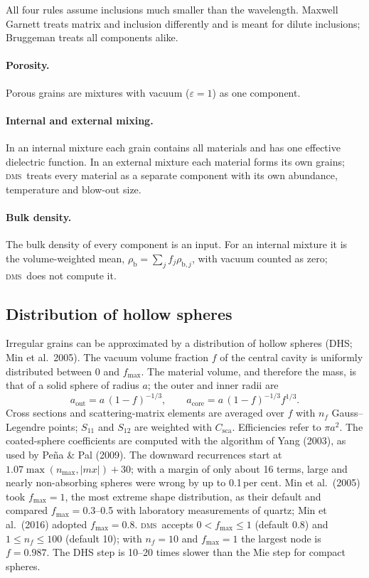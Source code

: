 \documentclass[11pt,a4paper]{article}
\newcommand{\dms}{\textsc{dms}}
\begin{document}
All four rules assume inclusions much smaller than the wavelength. Maxwell Garnett treats matrix
and inclusion differently and is meant for dilute inclusions; Bruggeman treats all components
alike.

\paragraph{Porosity.} Porous grains are mixtures with vacuum ($\varepsilon=1$) as one component.
\paragraph{Internal and external mixing.} In an internal mixture each grain contains all materials
and has one effective dielectric function. In an external mixture each material forms its own
grains; \dms\ treats every material as a separate component with its own abundance, temperature
and blow-out size.
\paragraph{Bulk density.} The bulk density of every component is an input. For an internal
mixture it is the volume-weighted mean, $\rho_\mathrm{b}=\sum_j f_j\rho_{\mathrm{b},j}$, with
vacuum counted as zero; \dms\ does not compute it.

\subsection{Distribution of hollow spheres}
\label{sec:dhs}

Irregular grains can be approximated by a distribution of hollow spheres (DHS; Min et al.\ 2005).
The vacuum volume fraction $f$ of the central cavity is uniformly distributed between 0 and
$f_\mathrm{max}$. The material volume, and therefore the mass, is that of a solid sphere of radius
$a$; the outer and inner radii are
\begin{equation}
a_\mathrm{out} = a\,(1-f)^{-1/3},\qquad a_\mathrm{core} = a\,(1-f)^{-1/3}f^{1/3}.
\end{equation}
Cross sections and scattering-matrix elements are averaged over $f$ with $n_f$ Gauss--Legendre
points; $S_{11}$ and $S_{12}$ are weighted with $C_\mathrm{sca}$. Efficiencies refer to $\pi a^2$.
The coated-sphere coefficients are computed with the algorithm of Yang (2003), as used by Pe\~na \&
Pal (2009). The downward recurrences start at $1.07\max(n_\mathrm{max},|mx|)+30$; with a margin of
only about 16 terms, large and nearly non-absorbing spheres were wrong by up to 0.1\,per cent.
Min et al.\ (2005) took $f_\mathrm{max}=1$,
the most extreme shape distribution, as their default and compared $f_\mathrm{max}=0.3$--0.5 with
laboratory measurements of quartz; Min et al.\ (2016) adopted $f_\mathrm{max}=0.8$. \dms\ accepts
$0<f_\mathrm{max}\le1$ (default 0.8) and $1\le n_f\le100$ (default 10); with $n_f=10$ and
$f_\mathrm{max}=1$ the largest node is $f=0.987$. The DHS
step is 10--20 times slower than the Mie step for compact spheres.
\end{document}
